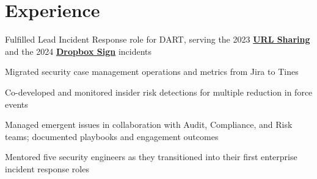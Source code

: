 \documentclass[letterpaper]{deedy-resume} %
\begin{document}
\begin{minipage}[t]{0.66\textwidth} %


\section{Experience}


\vspace{\topsep} %
\begin{tightitemize}
\item Fulfilled Lead Incident Response role for DART, serving the 2023 \textbf{\href{https://dropbox.tech/security/changing-how-we-identify-malicious-urls-in-shared-documents}{URL Sharing}} and the 2024 \textbf{\href{https://sign.dropbox.com/blog/a-recent-security-incident-involving-dropbox-sign}{Dropbox Sign}} incidents \\
\item Migrated security case management operations and metrics from Jira to Tines \\
\item Co-developed and monitored insider risk detections for multiple reduction in force events \\
\item Managed emergent issues in collaboration with Audit, Compliance, and Risk teams; documented playbooks and engagement outcomes \\
\item Mentored five security engineers as they transitioned into their first enterprise incident response roles \\
\end{tightitemize}

\sectionspace %




\end{minipage}
\end{document}
